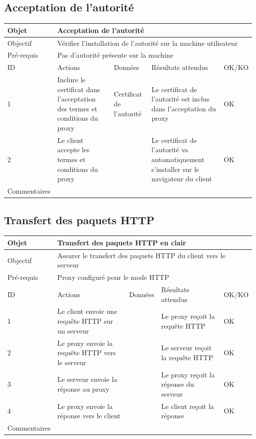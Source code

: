 \documentclass[a4paper,11pt,french]{article}
\begin{document}
\newpage

\subsection{Acceptation de l'autorité}

\begin{tabular}{|m{2.5cm}|m{4cm}|m{3cm}|m{3.5cm}|m{2cm}|}
\hline 
\rowcolor{Blue} Objet & \multicolumn{4}{|l|}{Acceptation de l'autorité} \\ 
\hline 
\rowcolor{Blue} Objectif & \multicolumn{4}{|l|}{Vérifier l'installation de l'autorité sur la machine utilisateur} \\ 
\hline 
\rowcolor{Blue} Pré-requis & \multicolumn{4}{|l|}{Pas d'autorité présente sur la machine} \\ 
\hline 
\rowcolor{Orange} ID & Actions & Données & Résultats attendus & OK/KO \\ 
\hline 
1 & Inclure le certificat dans l'acceptation des termes et conditions du proxy & Certificat de l'autorité & Le certificat de l'autorité est inclus dans l'acceptation du proxy & OK \\ 
\hline
2 & Le client accepte les termes et conditions du proxy & & Le certificat de 
l'autorité va automatiquement s'installer sur le navigateur du client & OK
\\
\hline 
Commentaires & \multicolumn{4}{|l|}{} \\ 
\hline
\end{tabular}

\newpage

\subsection{Transfert des paquets HTTP}

\begin{tabular}{|m{2.5cm}|m{4cm}|m{3cm}|m{3.5cm}|m{2cm}|}
\hline 
\rowcolor{Blue} Objet & \multicolumn{4}{|l|}{Transfert des paquets HTTP en clair} \\ 
\hline 
\rowcolor{Blue} Objectif & \multicolumn{4}{|l|}{Assurer le transfert des paquets HTTP du client vers le serveur} \\ 
\hline 
\rowcolor{Blue} Pré-requis & \multicolumn{4}{|l|}{Proxy configuré pour le mode HTTP} \\ 
\hline 
\rowcolor{Orange} ID & Actions & Données & Résultats attendus & OK/KO \\ 
\hline 
1 & Le client envoie une requête HTTP sur un serveur &  & Le proxy reçoit la requête HTTP & OK\\ 
\hline
2 & Le proxy envoie la requête HTTP vers le serveur & & Le serveur reçoit la requête HTTP & OK\\
\hline
3 & Le serveur envoie la réponse au proxy & & Le proxy 
reçoit la réponse du serveur & OK\\
\hline 
4 & Le proxy envoie la réponse vers le client & & Le client reçoit la réponse & OK
\\
\hline
Commentaires & \multicolumn{4}{|l|}{} \\ 
\hline
\end{tabular}
\end{document}
